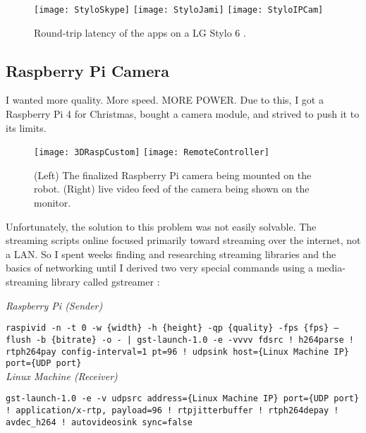 \begin{figure}[!htb]
    \centering
    \texttt{[image: StyloSkype]}
    \texttt{[image: StyloJami]}
    \texttt{[image: StyloIPCam]}
    \caption{
        Round-trip latency of the apps on a LG Stylo 6 \cite{Stylo}.
    }
\end{figure}

\newpage
\subsection{Raspberry Pi Camera}
I wanted more quality. More speed. MORE POWER. Due to this, I got a Raspberry Pi 4 for Christmas, bought a camera module, and strived to push it to its limits.

\begin{figure}[!htb]
    \centering
    \texttt{[image: 3DRaspCustom]}
    \texttt{[image: RemoteController]}
    \caption{
        (Left) The finalized Raspberry Pi camera being mounted on the robot. (Right) live video feed of the camera being shown on the monitor.
    }
\end{figure}

Unfortunately, the solution to this problem was not easily solvable. The streaming scripts online focused primarily toward streaming over the internet, not a LAN. So I spent weeks finding and researching streaming libraries and the basics of networking until I derived two very special commands using a media-streaming library called gstreamer \cite{gstreamer}:

\begin{centering}

\textit{Raspberry Pi (Sender)}

\texttt{raspivid -n -t 0 -w \{width\} -h \{height\} -qp \{quality\} -fps \{fps\} --flush -b \{bitrate\} -o - | gst-launch-1.0 -e -vvvv fdsrc ! h264parse ! rtph264pay config-interval=1 pt=96 ! udpsink host=\{Linux Machine IP\} port=\{UDP port\}} \\[1cm]

\textit{Linux Machine (Receiver)}

\texttt{gst-launch-1.0 -e -v udpsrc address=\{Linux Machine IP\} port=\{UDP port\} ! application/x-rtp, payload=96 ! rtpjitterbuffer ! rtph264depay ! avdec\_h264 ! autovideosink sync=false}

\end{centering}

